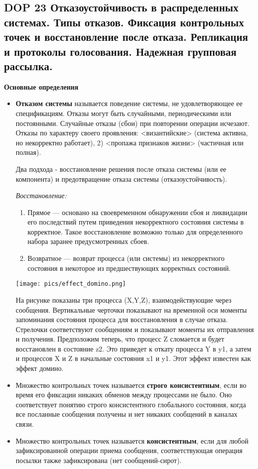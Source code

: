 \subsection*{DOP 23 Отказоустойчивость  в  распределенных  системах.  Типы  отказов.  Фиксация  контрольных  точек  и восстановление после отказа. Репликация и протоколы голосования. Надежная групповая рассылка.}

\textbf{Основные определения}

\begin{itemize}
    \item \textbf{Отказом системы} называется поведение системы, не удовлетворяющее ее спецификациям.
    Отказы могут быть случайными, периодическими или постоянными.
    Случайные отказы (сбои) при повторении операции исчезают.
    Отказы по характеру своего проявления: <византийские> (система активна, но некорректно работает), 2) <пропажа признаков жизни> (частичная или полная).

    Два подхода - восстановление решения после отказа системы (или ее компонента) и предотвращение отказа системы (отказоустойчивость).

    \textit{Восстановление:}
    \begin{enumerate}
        \item Прямое --- основано на своевременном обнаружении сбоя и ликвидации его последствий путем приведения некорректного состояния системы в корректное.
        Такое восстановление возможно только для определенного набора заранее предусмотренных сбоев.
        \item Возвратное --- возврат процесса (или системы) из некорректного состояния в некоторое из предшествующих корректных состояний.
    \end{enumerate}

    \texttt{[image: pics/effect\_domino.png]}

    На рисунке показаны три процесса (X,Y,Z), взаимодействующие через сообщения. Вертикальные черточки показывают на временной оси моменты запоминания состояния процесса для восстановления в случае отказа. Стрелочки соответствуют сообщениям и показывают моменты их отправления и получения. Предположим теперь, что процесс Z сломается и будет восстановлен в состояние z2. Это приведет к откату процесса Y в y1, а затем и процессов X и Z в начальные состояния x1 и y1. Этот эффект известен как эффект домино.

    \item Множество контрольных точек называется \textbf{строго консистентным}, если во время его фиксации никаких обменов между процессами не было.
    Оно соответствует понятию строго консистентного глобального состояния, когда все посланные сообщения получены и нет никаких сообщений в каналах связи.
    \item Множество контрольных точек называется \textbf{консистентным}, если для любой зафиксированной операции приема сообщения, соответствующая операция посылки также зафиксирована (нет сообщений-сирот).
\end{itemize}

